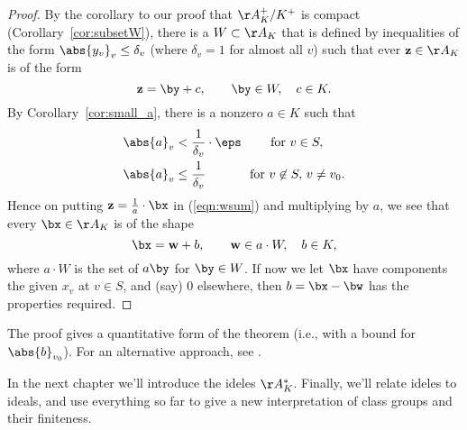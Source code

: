 \documentclass[11pt]{book}
\begin{document}
\begin{ch}
\begin{proof}
By the corollary to our proof that $\AA_K^+/K^+$ is compact
(Corollary~\ref{cor:subsetW}), there is a $W\subset \AA_K$ that is
defined by inequalities of the form $\abs{y_v}_v\leq \delta_v$ (where
$\delta_v=1$ for almost all $v$) such that ever $\mathbf{z}\in \AA_K$
is of the form
\begin{equation}\label{eqn:wsum}
  \mathbf{z} = \by + c, \qquad \by\in W, \quad c\in K.
\end{equation}
By Corollary~\ref{cor:small_a}, there is a nonzero $a\in K$ such
that
\begin{align*}
  \abs{a}_v &< \frac{1}{\delta_v}\cdot \eps\qquad \text{ for }v\in S,\\
  \abs{a}_v &\leq \frac{1}{\delta_v} \qquad\,\quad \text{ for } v\not\in S,\, v\neq v_0.
\end{align*}
Hence on putting $\mathbf{z} = \frac{1}{a}\cdot \bx$
in (\ref{eqn:wsum}) and multiplying by $a$, we see that
every $\bx\in \AA_K$ is of the shape
$$
  \bx = \mathbf{w} + b,\qquad \mathbf{w}\in a\cdot W, \quad b\in K,
$$
where $a\cdot W$ is the set of $a\by$ for $\by\in W$.
If now we let $\bx$ have components the given $x_v$ at $v\in S$,
and (say) $0$ elsewhere, then $b=\bx-\bw$ has the properties required.
\end{proof}

\begin{remark}
The proof gives a quantitative form of the theorem (i.e.,
with a bound for $\abs{b}_{v_0}$).  For an alternative approach,
see \cite{mahler:inequalities}.
\end{remark}

In the next chapter we'll introduce the ideles $\AA_K^*$.  Finally,
we'll relate ideles to ideals, and use everything so far to give a new
interpretation of class groups and their finiteness.
\end{ch}
\end{document}
